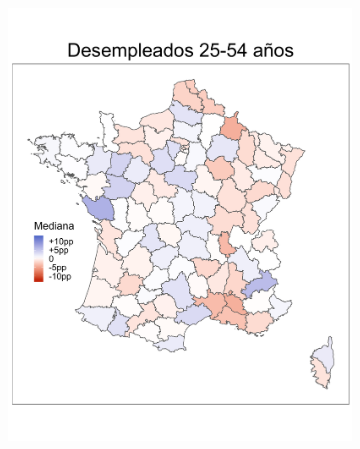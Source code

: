 \begin{figure}
\begin{subfigure}{0.275\textwidth}
	\includegraphics[width = \textwidth]{Figs/Efectos/Mapa_Efectos_Des2_Modelo_H}
	\end{subfigure}
	~
	\begin{subfigure}{0.275\textwidth}

\end{subfigure}
\end{figure}
